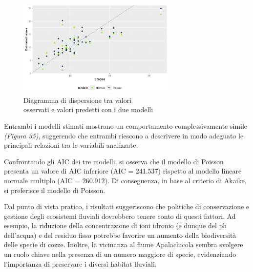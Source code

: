 \documentclass{article} %
\begin{document}
\begin{figure}[H]
    \centering
    \includegraphics[width=0.7\textwidth]{immagini/lm_glm.png}
    \captionsetup{justification=centering}
    \caption{Diagramma di dispersione tra valori \\osservati e valori predetti con i due modelli}
\end{figure}

Entrambi i modelli stimati mostrano un comportamento complessivamente simile \textit{(Figura 35)}, suggerendo che entrambi riescono a descrivere in modo adeguato le principali relazioni tra le variabili analizzate.

Confrontando gli AIC dei tre modelli, si osserva che il modello di Poisson presenta un valore di AIC inferiore (AIC = 241.537) rispetto al modello lineare normale multiplo (AIC = 260.912). Di conseguenza, in base al criterio di Akaike, si preferisce il modello di Poisson.

Dal punto di vista pratico, i risultati suggeriscono che politiche di conservazione e gestione degli ecosistemi fluviali dovrebbero tenere conto di questi fattori. Ad esempio, la riduzione della concentrazione di ioni idronio (e dunque del ph dell'acqua) e del residuo fisso potrebbe favorire un aumento della biodiversità delle specie di cozze. Inoltre, la vicinanza al fiume Apalachicola sembra svolgere un ruolo chiave nella presenza di un numero maggiore di specie, evidenziando l'importanza di preservare i diversi habitat fluviali.
\end{document}
